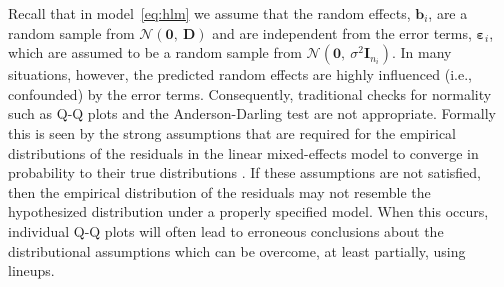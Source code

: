 \documentclass[12pt]{article} %
\begin{document}


Recall that in model~\eqref{eq:hlm} we assume that the random effects, $\bm{b}_i$, are a random sample from $\mathcal{N}(\bm{0},\ \bm{D})$ and are independent from the error terms, $\bm{\varepsilon}_i$, which are assumed to be a random sample from $\mathcal{N}(\bm{0},\ \sigma^2 \bm{I}_{n_i})$. In many situations, however, the predicted random effects are highly influenced (i.e., confounded) by the error terms. Consequently, traditional checks for normality such as Q-Q plots and the Anderson-Darling test are not appropriate. 
Formally this is seen by the
strong assumptions that are required for the empirical distributions of the residuals in the linear mixed-effects model to converge in probability to their true distributions \citep[Theorem 3.2 and Lemma 3.1]{Jiang:1998vt}. If these assumptions are not satisfied, then the empirical distribution of the residuals may not resemble the hypothesized distribution under a properly specified model. When this occurs, individual Q-Q plots will often lead to erroneous conclusions about the distributional assumptions which can be overcome, at least partially, using lineups.
\end{document}
